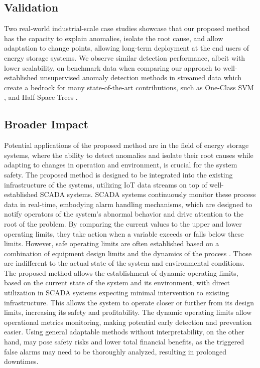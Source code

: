 \subsection{Validation}\label{par:validation}
Two real-world industrial-scale case studies showcase that our proposed method has the capacity to explain anomalies, isolate the root cause, and allow adaptation to change points, allowing long-term deployment at the end users of energy storage systems. We observe similar detection performance, albeit with lower scalability, on benchmark data when comparing our approach to well-established unsupervised anomaly detection methods in streamed data which create a bedrock for many state-of-the-art contributions, such as One-Class SVM \citep{Amer2013, Liu2014, Krawczyk2015, Miao2019, Gozuacik2021}, and Half-Space Trees \citep{Wetzig2019, Lyu2020}.

\subsection{Broader Impact}
Potential applications of the proposed method are in the field of energy storage systems, where the ability to detect anomalies and isolate their root causes while adapting to changes in operation and environment, is crucial for the system safety. The proposed method is designed to be integrated into the existing infrastructure of the systems, utilizing IoT data streams on top of well-established SCADA systems. SCADA systems continuously monitor these process data in real-time, embodying alarm handling mechanisms, which are designed to notify operators of the system's abnormal behavior and drive attention to the root of the problem. By comparing the current values to the upper and lower operating limits, they take action when a variable exceeds or falls below these limits. However, safe operating limits are often established based on a combination of equipment design limits and the dynamics of the process \citep{Stauffer2021}. Those are indifferent to the actual state of the system and environmental conditions. The proposed method allows the establishment of dynamic operating limits, based on the current state of the system and its environment, with direct utilization in SCADA systems expecting minimal intervention to existing infrastructure. This allows the system to operate closer or further from its design limits, increasing its safety and profitability. The dynamic operating limits allow operational metrics monitoring, making potential early detection and prevention easier. Using general adaptable methods without interpretability, on the other hand, may pose safety risks and lower total financial benefits, as the triggered false alarms may need to be thoroughly analyzed, resulting in prolonged downtimes.

